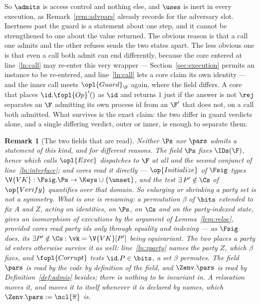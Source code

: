 \documentclass[10pt,oneside,openany]{book}
\theoremstyle{accentdef}
\newtheorem{remark}[definition]{Remark}
\theoremstyle{accentplain}
\begin{document}
So $\admits$ is access control and nothing else, and $\uses$ is inert in every execution, as
Remark~\ref{rem:advpars} already records for the adversary slot. Inertness past the guard is a
statement about one step, and it cannot be strengthened to one about the value returned. The
obvious reason is that a call one admits and the other refuses sends the two states apart. The less
obvious one is that even a call both admit can end differently, because the core entered at
line~\ref{ln:call} may re-enter this very wrapper --- Section~\ref{sec:execution} permits an
instance to be re-entered, and line~\ref{ln:call} lets a core claim its own identity --- and the
inner call meets $\opl{Guard}_{\F}$ again, where the field differs. A core that places
$\id.\fopl{Op}'()$ as $\id$ and returns $1$ just if the answer is not $\rej$ separates an $\F$
admitting its own process id from an $\F'$ that does not, on a call both admitted. What survives is
the exact claim: the two differ in guard verdicts alone, and a single differing verdict, outer or
inner, is enough to separate them.

\begin{remark}[The two fields that are read]\label{rem:fields}
Neither $\Ps$ nor $\pars$ admits a statement of this kind, and for different reasons. The field $\Ps$ fixes
$\IDs(\F)$, hence which calls $\opl{Exec}$ dispatches to $\F$ at all and the second conjunct of
line~\ref{ln:interface}; and cores read it directly --- $\op{Initialize}$ of $\Fsig$ types
$\V{VK} : \Fsig.\Ps \to \Keys \cup \{\unset\}$, and the test
$\exists\, P' \notin \Cs$ of $\op{Verify}$ quantifies over that domain. So
enlarging or shrinking a party set is not a symmetry. What \emph{is} one is \emph{renaming}: a
permutation $\beta$ of $\bits$ extended to fix $A$ and $Z$, acting on identities, on $\Ps$, on
$\Cs$ and on the party-indexed state, gives an isomorphism of executions by the argument of
Lemma~\ref{lem:reloc}, provided cores read party ids only through equality and
indexing --- as $\Fsig$ does, its $\exists P' \notin \Cs : \vk = \V{VK}[P']$ being equivariant. The
two places a party id enters otherwise survive it as well: line~\ref{ln:zparty} names the party $Z$,
which $\beta$ fixes, and $\fopl{Corrupt}$ tests $\id.P \in \bits$, a set $\beta$ permutes.
The field $\pars$ is read by the code by definition of the field, and $\Zenv.\pars$ is read by
Definition~\ref{def:admis} besides; there is nothing to be invariant in. A relocation moves it,
and moves it to itself whenever it is declared by names, which
$\Zenv.\pars := \ncl{\overline{\pi}}$ is.
\end{remark}
\end{document}
